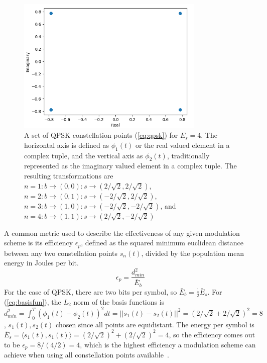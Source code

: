 \begin{figure}[ht!]
	\centering	\includegraphics[width=0.8\textwidth,keepaspectratio]{figs/qpsk.png}
    \caption{A set of QPSK constellation points (\ref{eq:qpsk}) for $E_s=4$. The horizontal axis is defined as $\phi_1(t)$ or the real valued element in a complex tuple, and the vertical axis as $\phi_2(t)$, traditionally represented as the imaginary valued element in a complex tuple. The resulting transformations are $n = 1 : b\rightarrow (0, 0) : s \rightarrow (2/\sqrt{2}, 2/\sqrt{2})$, $n = 2 : b\rightarrow (0, 1) : s \rightarrow (-2/\sqrt{2}, 2/\sqrt{2})$, $n = 3 : b\rightarrow (1, 0) : s \rightarrow (-2/\sqrt{2}, -2/\sqrt{2})$, and $n = 4 : b\rightarrow (1, 1) : s \rightarrow (2/\sqrt{2}, -2/\sqrt{2})$}
\label{fig:qpskconst}      
\end{figure}
A common metric used to describe the effectiveness of any given modulation scheme is its efficiency $\epsilon_p$, defined as the squared minimum euclidean distance between any two constellation points $s_n(t)$, divided by the population mean energy in Joules per bit.
\begin{equation}
\label{eq:modeff}
\epsilon_p = \frac{d_{min}^2}{\bar{E}_b}
\end{equation}
For the case of QPSK, there are two bits per symbol, so $\bar{E}_b = \frac{1}{2}\bar{E}_s$. For (\ref{eq:basisfun}), the $L_2$ norm of the basis functions is $d_{min}^2 = \int_0^T (\phi_1(t) - \phi_2(t))^2 dt = ||s_1(t) - s_2(t)||^2 = (2/\sqrt{2}+2/\sqrt{2})^2 = 8$, $s_1(t), s_2(t)$ chosen since all points are equidistant. The energy per symbol is $\bar{E}_s = \langle s_1(t), s_1(t) \rangle = (2/\sqrt{2})^2 + (2/\sqrt{2})^2 = 4$, so the efficiency comes out to be $\epsilon_p = 8/(4/2) = 4$, which is the highest efficiency a modulation scheme can achieve when using all constellation points available~\cite{rappaport1996wireless}.

